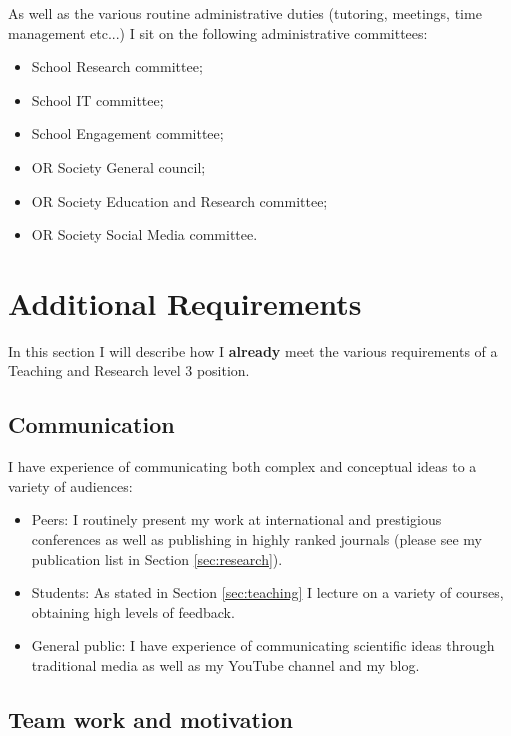 \documentclass{article}
\begin{document}
As well as the various routine administrative duties (tutoring, meetings, time management etc...) I sit on the following administrative committees:

\begin{itemize}
    \item School Research committee;
    \item School IT committee;
    \item School Engagement committee;
    \item OR Society General council;
    \item OR Society Education and Research committee;
    \item OR Society Social Media committee.
\end{itemize}

\section{Additional Requirements}\label{sec:additional}

In this section I will describe how I \textbf{already} meet the various requirements of a Teaching and Research level 3 position.

\subsection{Communication}

I have experience of communicating both complex and conceptual ideas to a variety of audiences:

\begin{itemize}
    \item Peers: I routinely present my work at international and prestigious conferences as well as publishing in highly ranked journals (please see my publication list in Section \ref{sec:research}).
    \item Students: As stated in Section \ref{sec:teaching} I lecture on a variety of courses, obtaining high levels of feedback.
    \item General public: I have experience of communicating scientific ideas through traditional media as well as my YouTube channel and my blog.
\end{itemize}

\subsection{Team work and motivation}
\end{document}
